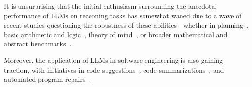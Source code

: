 It is unsurprising that the initial enthusiasm surrounding the anecdotal performance of LLMs on reasoning tasks has somewhat waned due to a wave of recent studies questioning the robustness of these abilities—whether in planning~\cite{valmeekam2023planning, kambhampati2024llmscantplanhelp}, basic arithmetic and logic~\cite{dziri2023faith}, theory of mind~\cite{ullman2023large, verma2024theory}, or broader mathematical and abstract benchmarks~\cite{gendron2023large, mccoy2023embers}.

Moreover, the application of LLMs in software engineering is also gaining traction, with initiatives in code suggestions~\cite{sridhara2023chatgptsoftware}, code summarizations~\cite{sun2023code}, and automated program repairs~\cite{xia2023conversationalrepair}.